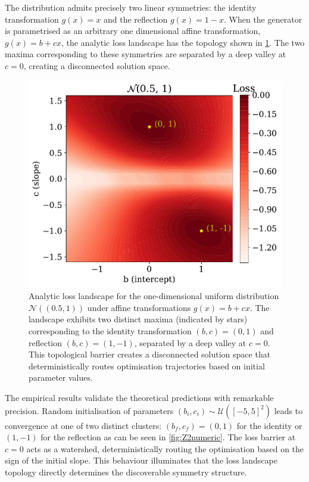                 The distribution admits precisely two linear symmetries: the identity transformation \(g(x)=x\) and the reflection \(g(x)=1-x\).
                When the generator is parametrised as an arbitrary one dimensional affine transformation, \(g(x)=b+cx\), the analytic loss landscape has the topology shown in \cref{fig:Z2analytic}.
                The two maxima corresponding to these symmetries are separated by a deep valley at \(c=0\), creating a disconnected solution space.
 \begin{figure}
     \centering
     \includegraphics[width=0.6\linewidth]{figures/chapter-09/Z2analytic.pdf}
     \caption{Analytic loss landscape for the one-dimensional uniform distribution $\mathcal{N}((0.5,1))$ under affine transformations $g(x) = b + cx$. The landscape exhibits two distinct maxima (indicated by stars) corresponding to the identity transformation $(b,c) = (0,1)$ and reflection $(b,c) = (1,-1)$, separated by a deep valley at $c = 0$.
     This topological barrier creates a disconnected solution space that deterministically routes optimisation trajectories based on initial parameter values.
     }
     \label{fig:Z2analytic}
 \end{figure}               
                The empirical results validate the theoretical predictions with remarkable precision.
                Random initialisation of parameters \((b_i, c_i) \sim \mathcal{U}([-5, 5]^2)\) leads to convergence at one of two distinct clusters: \((b_f, c_f) = (0, 1)\) for the identity or \((1, -1)\) for the reflection as can be seen in \cref{fig:Z2numeric}.
                The loss barrier at \(c=0\) acts as a watershed, deterministically routing the optimisation based on the sign of the initial slope.
                This behaviour illuminates that the loss landscape topology directly determines the discoverable symmetry structure.
